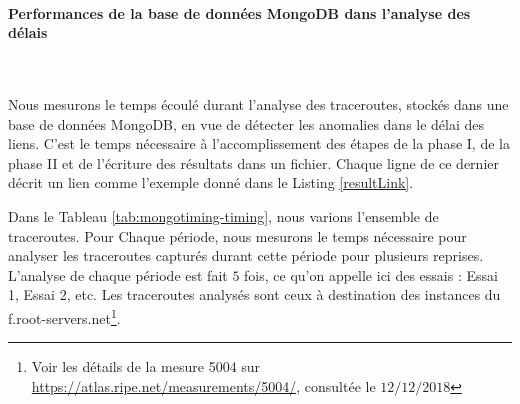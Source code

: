 \paragraph{Performances de la base de données MongoDB dans l'analyse des délais }~


Nous mesurons le temps écoulé durant l'analyse des traceroutes, stockés dans une base de données MongoDB,  en vue de détecter les anomalies dans le délai des liens. C'est le temps nécessaire à l'accomplissement des étapes de la phase I, de la phase II et de l'écriture des résultats dans un fichier. Chaque ligne de ce dernier  décrit un lien comme l'exemple donné dans le Listing \ref{resultLink}.  

Dans le Tableau \ref{tab:mongotiming-timing}, nous varions l'ensemble de traceroutes. Pour Chaque période, nous mesurons le temps nécessaire pour analyser les traceroutes capturés durant cette période pour plusieurs reprises. L'analyse de chaque période est fait $5$ fois, ce qu'on appelle ici des essais : Essai 1, Essai 2, etc.  Les traceroutes analysés sont ceux à destination des instances du f.root-servers.net\footnote{Voir les détails de la mesure 5004 sur \url{https://atlas.ripe.net/measurements/5004/}, consultée le $12/12/2018$}.



\begin{table}[h]
	\captionsetup{justification=centering}
\caption{Les temps d'exécution d'analyse de traceroutes en fonction de la taille de données avec MongoDB}
\label{tab:mongotiming-timing}
\end{table}

